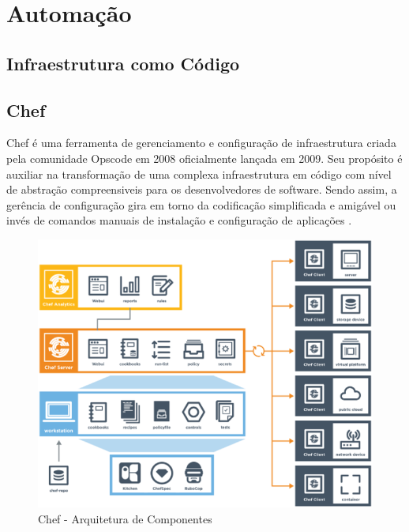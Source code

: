 \section{Automação}

\subsection{Infraestrutura como Código}

\subsection{Chef}
\label{sec:chef}

Chef é uma ferramenta de gerenciamento e configuração de infraestrutura criada
pela comunidade Opscode em 2008 oficialmente lançada em 2009. Seu propósito é
auxiliar na transformação de uma complexa infraestrutura em código com nível
de abstração compreensiveis para os desenvolvedores de software. Sendo assim,
a gerência de configuração gira em torno da codificação simplificada e amigável
ou invés de comandos manuais de instalação e configuração de aplicações
\cite{sharma:2015}.

\begin{figure}[h]
  \label{fig:arch_chef}
  \centering
  \includegraphics[width=\textwidth]{figuras/arch_chef.eps}
  \caption{Chef - Arquitetura de Componentes}
\end{figure}


